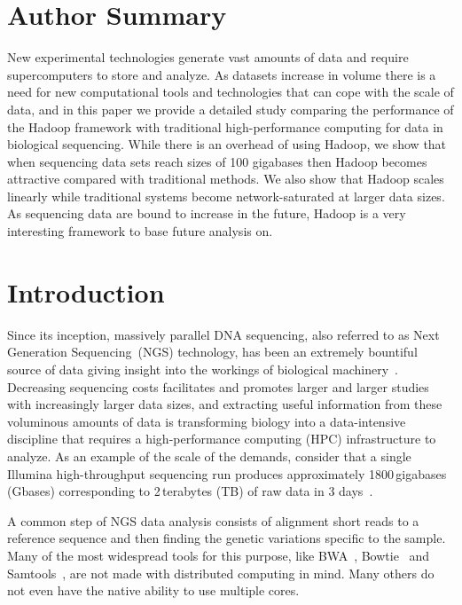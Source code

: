 \documentclass[10pt]{article}
\begin{document}
\section*{Author Summary}
New experimental technologies generate vast amounts of data and require supercomputers to store and analyze. As datasets increase in volume there is a need for new computational tools and technologies that can cope with the scale of data, and in this paper we provide a detailed study comparing the performance of the Hadoop framework with traditional high-performance computing for data in biological sequencing. While there is an overhead of using Hadoop, we show that when sequencing data sets reach sizes of 100 gigabases then Hadoop becomes attractive compared with traditional methods. We also show that Hadoop scales linearly while traditional systems become network-saturated at larger data sizes. As sequencing data are bound to increase in the future, Hadoop is a very interesting framework to base future analysis on.





\section*{Introduction}
Since its inception, massively parallel DNA sequencing, also referred to as Next Generation Sequencing~(NGS) technology, has been an extremely bountiful source of data giving insight into the workings of biological machinery~\cite{metzker, Marx:2013fk}. Decreasing sequencing costs facilitates and promotes larger and larger studies with increasingly larger data sizes, and extracting useful information from these voluminous amounts of data is transforming biology into a data-intensive discipline that requires a high-performance computing (HPC) infrastructure to analyze.  As an example of the scale of the demands, consider that a single Illumina high-throughput sequencing run produces approximately 1800\,gigabases (Gbases) corresponding to 2\,terabytes (TB) of raw data in 3 days~\cite{illumina}.

A common step of NGS data analysis consists of alignment short reads to a reference sequence and then finding the genetic variations specific to the sample.
Many of the most widespread tools for this purpose, like BWA~\cite{bwa}, Bowtie~\cite{Langmead:2009uq} and Samtools~\cite{samtools}, are not made with distributed computing in mind. Many others do not even have the native ability to use multiple cores. 
\end{document}
